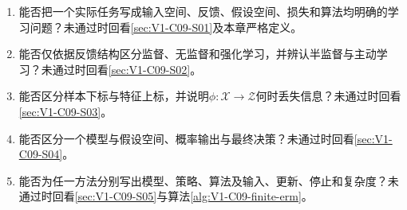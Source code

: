 \begin{SLCompactClosure}
\label{schema:V1-C09:CH-36}

\begin{selfcheckbox}\label{schema:V1-C09:CH-37}
\begin{enumerate}[leftmargin=2.2em,nosep]
  \item 能否把一个实际任务写成输入空间、反馈、假设空间、损失和算法均明确的学习问题？未通过时回看\cref{sec:V1-C09-S01}及本章严格定义。
  \item 能否仅依据反馈结构区分监督、无监督和强化学习，并辨认半监督与主动学习？未通过时回看\cref{sec:V1-C09-S02}。
  \item 能否区分样本下标与特征上标，并说明$\phi:\mathcal X\to\mathcal Z$何时丢失信息？未通过时回看\cref{sec:V1-C09-S03}。
  \item 能否区分一个模型与假设空间、概率输出与最终决策？未通过时回看\cref{sec:V1-C09-S04}。
  \item 能否为任一方法分别写出模型、策略、算法及输入、更新、停止和复杂度？未通过时回看\cref{sec:V1-C09-S05}与算法\ref{alg:V1-C09-finite-erm}。
\end{enumerate}
\end{selfcheckbox}
\end{SLCompactClosure}
